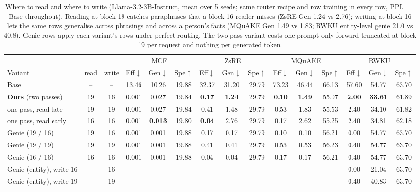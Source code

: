 \begin{table}[t]
\centering
\small
\setlength{\tabcolsep}{3.4pt}
\begin{tabular}{l c c ccc ccc ccc ccc}
\toprule
& & & \multicolumn{3}{c}{MCF} & \multicolumn{3}{c}{ZsRE} & \multicolumn{3}{c}{MQuAKE} & \multicolumn{3}{c}{RWKU} \\
\cmidrule(lr){4-6}\cmidrule(lr){7-9}\cmidrule(lr){10-12}\cmidrule(lr){13-15}
Variant & read & write & Eff$\downarrow$ & Gen$\downarrow$ & Spe$\uparrow$ & Eff$\downarrow$ & Gen$\downarrow$ & Spe$\uparrow$ & Eff$\downarrow$ & Gen$\downarrow$ & Spe$\uparrow$ & Eff$\downarrow$ & Gen$\downarrow$ & Spe$\uparrow$ \\
\midrule
Base & -- & -- & 13.46 & 10.26 & 19.88 & 32.37 & 31.20 & 29.79 & 73.23 & 46.44 & 66.13 & 57.60 & 54.77 & 63.70 \\
\midrule
\textbf{Ours} (two passes) & 19 & 16 & 0.001 & 0.027 & 19.84 & \textbf{0.17} & \textbf{1.24} & 29.79 & \textbf{0.10} & \textbf{1.49} & 55.07 & \textbf{2.00} & \textbf{33.61} & 61.89 \\
\quad one pass, read late & 19 & 19 & 0.001 & 0.027 & 19.84 & 0.41 & 1.48 & 29.79 & 0.53 & 1.83 & 55.53 & 2.40 & 34.10 & 61.82 \\
\quad one pass, read early & 16 & 16 & 0.001 & \textbf{0.013} & 19.80 & \textbf{0.04} & 2.76 & 29.79 & 0.17 & 2.62 & 55.25 & 2.40 & 34.81 & 62.18 \\
\midrule
Genie (19 / 16) & 19 & 16 & 0.001 & 0.001 & 19.88 & 0.17 & 0.17 & 29.79 & 0.10 & 0.10 & 56.21 & 0.00 & 54.77 & 63.70 \\
Genie (19 / 19) & 19 & 19 & 0.001 & 0.001 & 19.88 & 0.41 & 0.41 & 29.79 & 0.53 & 0.53 & 56.23 & 0.40 & 54.77 & 63.70 \\
Genie (16 / 16) & 16 & 16 & 0.001 & 0.001 & 19.88 & 0.04 & 0.04 & 29.79 & 0.17 & 0.17 & 56.21 & 0.40 & 54.77 & 63.70 \\
Genie (entity), write 16 & -- & 16 & -- & -- & -- & -- & -- & -- & -- & -- & -- & 0.00 & 21.04 & 63.70 \\
Genie (entity), write 19 & -- & 19 & -- & -- & -- & -- & -- & -- & -- & -- & -- & 0.40 & 40.83 & 63.70 \\
\bottomrule
\end{tabular}
\caption{Where to read and where to write (Llama-3.2-3B-Instruct, mean over 5 seeds; same router
recipe and row training in every row, PPL $=$ Base throughout). Reading at block 19 catches
paraphrases that a block-16 reader misses (ZsRE Gen 1.24 vs 2.76); writing at block 16 lets the
same rows generalise across phrasings and across a person's facts (MQuAKE Gen 1.49 vs 1.83;
RWKU entity-level genie 21.0 vs 40.8). Genie rows apply each variant's rows under perfect routing.
The two-pass variant costs one prompt-only forward truncated at block 19 per request and nothing
per generated token.}
\label{tab:ablation_layers}
\end{table}
